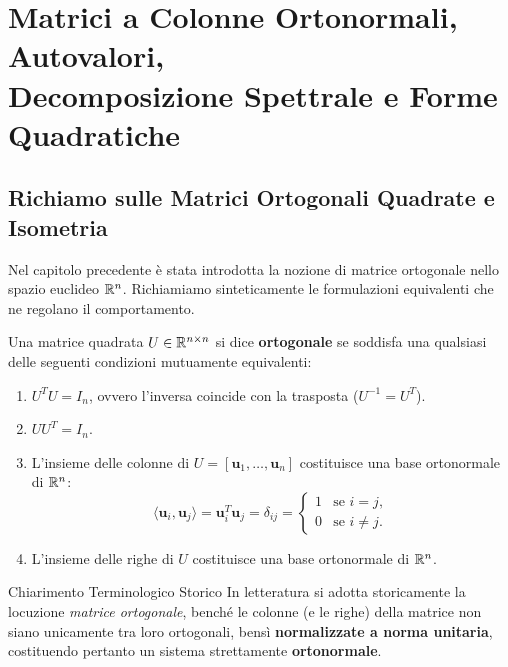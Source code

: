 \chapter[Matrici Ortonormali, Autovalori e Forme Quadratiche]{Matrici a Colonne Ortonormali, Autovalori,\\Decomposizione Spettrale e Forme Quadratiche}
\label{chap:matrici-ortonormali-autovalori-forme-quadratiche}

\FloatBarrier
\section{Richiamo sulle Matrici Ortogonali Quadrate e Isometria}

Nel capitolo precedente \`e stata introdotta la nozione di matrice ortogonale nello spazio euclideo $\mathbb{R}^n$. Richiamiamo sinteticamente le formulazioni equivalenti che ne regolano il comportamento.

\begin{definition}
\label{def:ortogonale-quadrata-recap}
Una matrice quadrata $U \in \mathbb{R}^{n \times n}$ si dice \textbf{ortogonale} se soddisfa una qualsiasi delle seguenti condizioni mutuamente equivalenti:
\begin{enumerate}
    \item $U^T U = I_n$, ovvero l'inversa coincide con la trasposta ($U^{-1} = U^T$).
    \item $U U^T = I_n$.
    \item L'insieme delle colonne di $U = [\mathbf{u}_1, \dots, \mathbf{u}_n]$ costituisce una base ortonormale di $\mathbb{R}^n$:
    \begin{equation}
        \langle \mathbf{u}_i, \mathbf{u}_j \rangle = \mathbf{u}_i^T \mathbf{u}_j = \delta_{ij} = \begin{cases} 1 & \text{se } i = j, \\ 0 & \text{se } i \neq j. \end{cases}
    \end{equation}
    \item L'insieme delle righe di $U$ costituisce una base ortonormale di $\mathbb{R}^n$.
\end{enumerate}
\end{definition}

\begin{noteblock}{Chiarimento Terminologico Storico}
In letteratura si adotta storicamente la locuzione \textit{matrice ortogonale}, bench\'e le colonne (e le righe) della matrice non siano unicamente tra loro ortogonali, bens\`i \textbf{normalizzate a norma unitaria}, costituendo pertanto un sistema strettamente \textbf{ortonormale}.
\end{noteblock}

